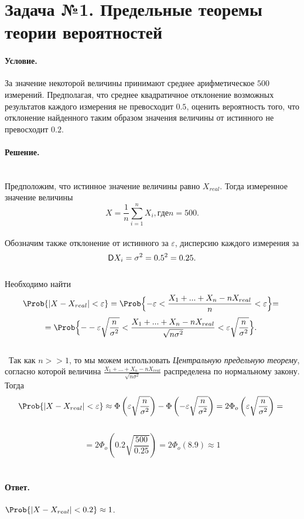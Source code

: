 
\section{Задача №1. Предельные теоремы теории вероятностей}

\paragraph{Условие.} За значение некоторой величины принимают среднее арифметическое $500$ измерений. Предполагая, что среднее квадратичное отклонение возможных результатов каждого измерения не превосходит $0.5$, оценить вероятность того, что отклонение найденного таким образом значения величины от истинного не превосходит $0.2$.

\paragraph{Решение.}\hfill\\
Предположим, что истинное значение величины равно $X_{real}.$ Тогда измеренное значение величины
 \[
 	X = \frac{1}{n}\sum_{i=1}^n X_{i}, где n=500. 
\]
\\
Обозначим также отклонение от истинного за $\varepsilon$, дисперсию каждого измерения за 
\[
	\mathsf{D} X_{i}=\sigma^2=0.5^2=0.25.
\]
\\
Необходимо найти 
\[
    \Prob\{|X-X_{real}| < \varepsilon\} =  \Prob \Bigl\{-\varepsilon < \frac{X_{1}+ ... + X_{n} - nX_{real}}{n} < \varepsilon \Bigl\} = 
 \]
\[
    = \Prob\Bigl\{--\varepsilon  \sqrt{\frac{n}{\sigma^2}} < \frac{X_{1}+ ... + X_{n} - nX_{real}}{\sqrt{n\sigma^2}} < \varepsilon  \sqrt{\frac{n}{\sigma^2}}\Bigl\} .
 \]
 \\
 Так как $n >> 1$, то мы можем использовать \emph{Центральную предельную теорему}, согласно которой величина $\frac{X_{1}+ ... + X_{n} - nX_{real}}{\sqrt{n\sigma^2}}$ распределена по нормальному закону. Тогда
 \[
	\Prob\{|X-X_{real}| < \varepsilon\} \approx \Phi \left(\varepsilon \sqrt{\frac{n}{\sigma^2}}\right) - \Phi \left(- \varepsilon \sqrt{\frac{n}{\sigma^2}}\right) =
	2\Phi_{o} \left(\varepsilon \sqrt{\frac{n}{\sigma^2}}\right) = 
 \]
 
 \[
  = 2\Phi_{o} \left(0.2 \sqrt{\frac{500}{0.25}}\right) = 2\Phi_{o} \left( 8.9 \right)   \approx 1
 \]
 		
 



\noindent

\paragraph{Ответ.} $\Prob\{|X-X_{real}| < 0.2\}\approx1$.